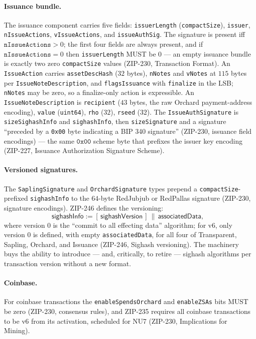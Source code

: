 \documentclass[11pt,a4paper]{article}
\theoremstyle{definition}
\begin{document}
\paragraph{Issuance bundle.} The issuance component carries five fields:
\texttt{issuerLength} (\texttt{compactSize}), \texttt{issuer},
\texttt{nIssueActions}, \texttt{vIssueActions}, and
\texttt{issueAuthSig}. The signature is present
iff $\texttt{nIssueActions} > 0$; the first four fields are always present,
and if $\texttt{nIssueActions} = 0$ then \texttt{issuerLength} MUST be $0$
--- an empty issuance bundle is exactly two zero \texttt{compactSize}
values (ZIP-230, Transaction Format). An \texttt{IssueAction} carries
\texttt{assetDescHash} ($32$ bytes), \texttt{nNotes} and \texttt{vNotes} at
$115$ bytes per \texttt{IssueNoteDescription}, and \texttt{flagsIssuance}
with \texttt{finalize} in the LSB; \texttt{nNotes} may be zero, so a
finalize-only action is expressible. An \texttt{IssueNoteDescription} is
\texttt{recipient} ($43$ bytes, the raw Orchard payment-address encoding),
\texttt{value} (\texttt{uint64}), \texttt{rho} ($32$), \texttt{rseed} ($32$).
The \texttt{IssueAuthSignature} is \texttt{sizeSighashInfo} and
\texttt{sighashInfo}, then \texttt{sizeSignature} and a signature ``preceded
by a \texttt{0x00} byte indicating a BIP 340 signature'' (ZIP-230, issuance
field encodings) --- the same $\mathtt{0x00}$ scheme byte that prefixes the
issuer key encoding (ZIP-227, Issuance Authorization Signature Scheme).

\paragraph{Versioned signatures.} The \texttt{SaplingSignature} and
\texttt{OrchardSignature} types prepend a \texttt{compactSize}-prefixed
\texttt{sighashInfo} to the $64$-byte RedJubjub or RedPallas signature
(ZIP-230, signature encodings). ZIP-246 defines the versioning:
\[
\mathsf{sighashInfo} := [\,\mathsf{sighashVersion}\,] \,\|\,
\mathsf{associatedData},
\]
where version $0$ is the ``commit to all effecting data'' algorithm; for v6,
only version $0$ is defined, with empty \texttt{associatedData}, for all four
of Transparent, Sapling, Orchard, and Issuance (ZIP-246, Sighash versioning).
The machinery buys the ability to introduce --- and, critically, to retire
--- sighash algorithms per transaction version without a new format.

\paragraph{Coinbase.} For coinbase transactions the
\texttt{enableSpendsOrchard} and \texttt{enableZSAs} bits MUST be zero
(ZIP-230, consensus rules), and ZIP-235 requires all coinbase transactions to
be v6 from its activation, scheduled for NU7 (ZIP-230, Implications for
Mining).
\end{document}
